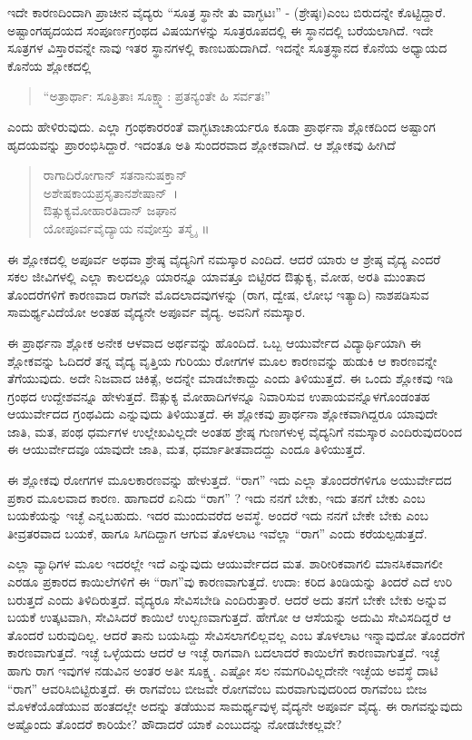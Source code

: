 {ಇದೇ ಕಾರಣದಿಂದಾಗಿ ಪ್ರಾಚೀನ ವೈದ್ಯರು “ಸೂತ್ರ ಸ್ಥಾನೇ ತು ವಾಗ್ಭಟಃ” - (ಶ್ರೇಷ್ಠಃ)ಎಂಬ ಬಿರುದನ್ನೇ ಕೊಟ್ಟಿದ್ದಾರೆ. ಅಷ್ಟಾಂಗಹೃದಯದ ಸಂಪೂರ್ಣಗ್ರಂಥದ ವಿಷಯಗಳನ್ನು ಸೂತ್ರರೂಪದಲ್ಲಿ ಈ ಸ್ಥಾನದಲ್ಲಿ ಬರೆಯಲಾಗಿದೆ. ಇದೇ ಸೂತ್ರಗಳ ವಿಸ್ತಾರವನ್ನೇ ನಾವು ಇತರ ಸ್ಥಾನಗಳಲ್ಲಿ ಕಾಣಬಹುದಾಗಿದೆ. ಇದನ್ನೇ ಸೂತ್ರಸ್ಥಾನದ ಕೊನೆಯ ಅಧ್ಯಾಯದ ಕೊನೆಯ ಶ್ಲೋಕದಲ್ಲಿ 
\begin{verse}
“ಅತ್ರಾರ್ಥಾ: ಸೂತ್ರಿತಾಃ ಸೂಕ್ಷ್ಮಾ: ಪ್ರತನ್ಯಂತೇ ಹಿ ಸರ್ವತಃ” 
\end{verse}
ಎಂದು ಹೇಳಿರುವುದು. ಎಲ್ಲಾ ಗ್ರಂಥಕಾರರಂತೆ ವಾಗ್ಭಟಾಚಾರ್ಯರೂ ಕೂಡಾ ಪ್ರಾರ್ಥನಾ ಶ್ಲೋಕದಿಂದ ಅಷ್ಟಾಂಗ ಹೃದಯವನ್ನು ಪ್ರಾರಂಭಿಸಿದ್ದಾರೆ. ಇದಂತೂ ಅತಿ ಸುಂದರವಾದ ಶ್ಲೋಕವಾಗಿದೆ. ಆ ಶ್ಲೋಕವು ಹೀಗಿದೆ \
\begin{verse}
ರಾಗಾದಿರೋಗಾನ್ ಸತನಾನುಷಕ್ತಾನ್\\
ಅಶೇಷಕಾಯಪ್ರಸೃತಾನಶೇಷಾನ್~। \\
ಔತ್ಸುಕ್ಯಮೋಹಾರತಿದಾನ್‍ ಜಘಾನ\\
ಯೋಪೂರ್ವವೈದ್ಯಾಯ ನವೋಸ್ತು ತಸ್ಮೈ~॥
\end{verse}
ಈ ಶ್ಲೋಕದಲ್ಲಿ ಅಪೂರ್ವ ಅಥವಾ ಶ್ರೇಷ್ಠ ವೈದ್ಯನಿಗೆ ನಮಸ್ಕಾರ ಎಂದಿದೆ. ಆದರೆ ಯಾರು ಆ ಶ್ರೇಷ್ಠ ವೈದ್ಯ ಎಂದರೆ ಸಕಲ ಜೀವಿಗಳಲ್ಲಿ ಎಲ್ಲಾ ಕಾಲದಲ್ಲೂ ಯಾರನ್ನೂ ಯಾವತ್ತೂ ಬಿಟ್ಟಿರದ ಔತ್ಸುಕ್ಯ, ಮೋಹ, ಅರತಿ ಮುಂತಾದ ತೊಂದರೆಗಳಿಗೆ ಕಾರಣವಾದ ರಾಗವೇ ಮೊದಲಾದವುಗಳನ್ನು (ರಾಗ, ದ್ವೇಷ, ಲೋಭ ಇತ್ಯಾದಿ) ನಾಶಪಡಿಸುವ ಸಾಮರ್ಥ್ಯವಿದೆಯೋ ಅಂತಹ ವೈದ್ಯನೇ ಅಪೂರ್ವ ವೈದ್ಯ. ಅವನಿಗೆ ನಮಸ್ಕಾರ.

ಈ ಪ್ರಾರ್ಥನಾ ಶ್ಲೋಕ ಅನೇಕ ಆಳವಾದ ಅರ್ಥವನ್ನು ಹೊಂದಿದೆ. ಒಬ್ಬ ಆಯುರ್ವೇದ ವಿದ್ಯಾರ್ಥಿಯಾಗಿ  ಈ ಶ್ಲೋಕವನ್ನು ಓದಿದರೆ ತನ್ನ ವೈದ್ಯ ವೃತ್ತಿಯ ಗುರಿಯು ರೋಗಗಳ ಮೂಲ ಕಾರಣವನ್ನು ಹುಡುಕಿ ಆ ಕಾರಣವನ್ನೇ ತೆಗೆಯುವುದು. ಅದೇ ನಿಜವಾದ ಚಿಕಿತ್ಸೆ, ಅದನ್ನೇ ಮಾಡಬೇಕಾದ್ದು ಎಂದು ತಿಳಿಯುತ್ತದೆ. ಈ ಒಂದು ಶ್ಲೋಕವು ಇಡಿ ಗ್ರಂಥದ ಉದ್ದೇಶವನ್ನೂ ಹೇಳುತ್ತದೆ. ಔತ್ಸುಕ್ಯ ಮೋಹಾದಿಗಳನ್ನೂ ನಿವಾರಿಸುವ ಉಪಾಯವನ್ನೊಳಗೊಂಡಂತಹ ಆಯುರ್ವೇದದ ಗ್ರಂಥವಿದು ಎನ್ನುವುದು ತಿಳಿಯುತ್ತದೆ. ಈ ಶ್ಲೋಕವು ಪ್ರಾರ್ಥನಾ ಶ್ಲೋಕವಾಗಿದ್ದರೂ ಯಾವುದೇ ಜಾತಿ, ಮತ, ಪಂಥ ಧರ್ಮಗಳ ಉಲ್ಲೇಖವಿಲ್ಲದೇ ಅಂತಹ ಶ್ರೇಷ್ಠ ಗುಣಗಳುಳ್ಳ ವೈದ್ಯನಿಗೆ ನಮಸ್ಕಾರ ಎಂದಿರುವುದರಿಂದ ಈ ಆಯುರ್ವೇದವೂ ಯಾವುದೇ ಜಾತಿ, ಮತ, ಧರ್ಮಾತೀತವಾದದ್ದು ಎಂದೂ ತಿಳಿಯುತ್ತದೆ.

ಈ ಶ್ಲೋಕವು ರೋಗಗಳ ಮೂಲಕಾರಣವನ್ನು ಹೇಳುತ್ತದೆ. “ರಾಗ” ಇದು ಎಲ್ಲಾ ತೊಂದರೆಗಳಿಗೂ ಅಯುರ್ವೇದದ ಪ್ರಕಾರ ಮೂಲವಾದ ಕಾರಣ. ಹಾಗಾದರೆ ಏನಿದು “ರಾಗ” ? ಇದು ನನಗೆ ಬೇಕು, ಇದು ತನಗೆ ಬೇಕು ಎಂಬ ಬಯಕೆಯನ್ನು ಇಚ್ಛೆ ಎನ್ನಬಹುದು. ಇದರ ಮುಂದುವರೆದ ಅವಸ್ಥೆ. ಅಂದರೆ ಇದು ನನಗೆ ಬೇಕೇ ಬೇಕು ಎಂಬ ತೀವ್ರತರವಾದ ಬಯಕೆ, ಹಾಗೂ ಸಿಗದಿದ್ದಾಗ ಆಗುವ ತೊಳಲಾಟ ಇವೆಲ್ಲಾ “ರಾಗ” ಎಂದು ಕರೆಯಲ್ಪಡುತ್ತದೆ.

ಎಲ್ಲಾ ವ್ಯಾಧಿಗಳ ಮೂಲ ಇದರಲ್ಲೇ ಇದೆ ಎನ್ನುವುದು ಆಯುರ್ವೇದದ ಮತ. ಶಾರೀರಿಕವಾಗಲಿ ಮಾನಸಿಕವಾಗಲೀ ಎರಡೂ ಪ್ರಕಾರದ ಕಾಯಿಲೆಗಳಿಗೆ ಈ “ರಾಗ”ವು ಕಾರಣವಾಗುತ್ತದೆ. ಉದಾ: ಕರಿದ ತಿಂಡಿಯನ್ನು ತಿಂದರೆ ಎದೆ ಉರಿ ಬರುತ್ತದೆ ಎಂದು ತಿಳಿದಿರುತ್ತದೆ. ವೈದ್ಯರೂ ಸೇವಿಸಬೇಡಿ ಎಂದಿರುತ್ತಾರೆ. ಆದರೆ ಅದು ತನಗೆ ಬೇಕೇ ಬೇಕು ಅನ್ನುವ ಬಯಕೆ ಉತ್ಕಟವಾಗಿ, ಸೇವಿಸಿದರೆ ಕಾಯಿಲೆ ಉಲ್ಬಣವಾಗುತ್ತದೆ. ಹೇಗೋ ಆ ಆಸೆಯನ್ನು ಅದುಮಿ ಸೇವಿಸದಿದ್ದರೆ ಆ ತೊಂದರೆ ಬರುವುದಿಲ್ಲ. ಆದರೆ ತಾನು ಬಯಸಿದ್ದು ಸೇವಿಸಲಾಗಲಿಲ್ಲವಲ್ಲ ಎಂಬ ತೊಳಲಾಟ ಇನ್ನಾವುದೋ ತೊಂದರೆಗೆ  ಕಾರಣವಾಗುತ್ತದೆ. ಇಚ್ಛೆ ಒಳ್ಳೆಯದು ಆದರೆ ಆ ಇಚ್ಛೆ ರಾಗವಾಗಿ ಬದಲಾದರೆ ಕಾಯಿಲೆಗೆ ಕಾರಣವಾಗುತ್ತದೆ. ಇಚ್ಛೆ ಹಾಗು ರಾಗ ಇವುಗಳ ನಡುವಿನ ಅಂತರ ಅತೀ ಸೂಕ್ಷ್ಮ. ಎಷ್ಟೋ ಸಲ ನಮಗರಿವಿಲ್ಲದೇನೇ ಇಚ್ಛೆಯ ಅವಸ್ಥೆ ದಾಟಿ “ರಾಗ” ಆವರಿಸಿಬಿಟ್ಟಿರುತ್ತದೆ. ಈ ರಾಗವೆಂಬ ಬೀಜವೇ ರೋಗವೆಂಬ ಮರವಾಗುವುದರಿಂದ ರಾಗವೆಂಬ ಬೀಜ ಮೊಳಕೆಯೊಡೆಯುವ ಹಂತದಲ್ಲೇ ಅದನ್ನು ತಡೆಯುವ ಸಾಮರ್ಥ್ಯವುಳ್ಳ ವೈದ್ಯನೇ ಅಪೂರ್ವ ವೈದ್ಯ. ಈ ರಾಗವನ್ನುವುದು ಅಷ್ಟೊಂದು ತೊಂದರೆ ಕಾರಿಯೇ? ಹೌದಾದರೆ ಯಾಕೆ ಎಂಬುದನ್ನು ನೋಡಬೇಕಲ್ಲವೇ?

}
